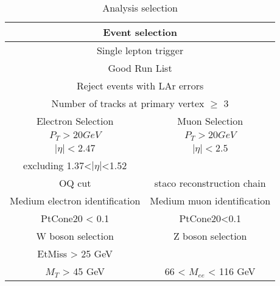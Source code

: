 \begin{table}[h]
    \caption{Analysis selection}
    \label{tab:eventSelection}
    \begin{center}
    \begin{tabular}{ c | c}
        \hline
        \hline
        \multicolumn{2}{c}{Event selection}\\
        \hline
        \multicolumn{2}{c}{Single lepton trigger}\\
        \multicolumn{2}{c}{Good Run List}\\
        \multicolumn{2}{c}{Reject events with LAr errors}\\
        \multicolumn{2}{c}{Number of tracks at primary vertex $\geq$ 3}\\
        \hline
        \hline
        Electron Selection & Muon Selection\\
        \hline

        $P_T>20GeV$ & $P_T>20GeV$\\
        $|\eta|<2.47$ & $|\eta|<2.5$\\
        excluding 1.37<$|\eta|$<1.52 & \\
        OQ cut & staco reconstruction chain \\
        Medium electron identification & Medium muon identification \\
        PtCone20 < 0.1 & PtCone20<0.1 \\

        \hline
        \hline
        W boson selection & Z boson selection \\
        \hline
        EtMiss > 25 GeV &  \\
        $M_T$ > 45 GeV & 66 < $M_{ee}$ < 116 GeV\\
        \hline
        \hline
    \end{tabular}
    \end{center}
\end{table}
